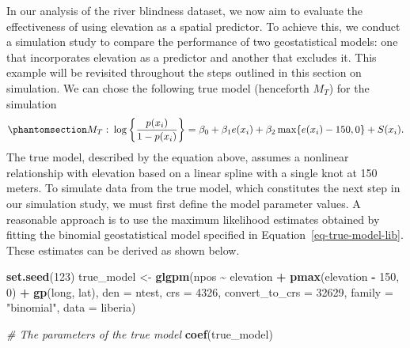 \documentclass[
  letterpaper,
]{krantz}
\newenvironment{Shaded}{\begin{snugshade}}{\end{snugshade}}
\newcommand{\AttributeTok}[1]{\textcolor[rgb]{0.13,0.29,0.53}{#1}}
\newcommand{\CommentTok}[1]{\textcolor[rgb]{0.56,0.35,0.01}{\textit{#1}}}
\newcommand{\DecValTok}[1]{\textcolor[rgb]{0.00,0.00,0.81}{#1}}
\newcommand{\FunctionTok}[1]{\textcolor[rgb]{0.13,0.29,0.53}{\textbf{#1}}}
\newcommand{\NormalTok}[1]{#1}
\newcommand{\OtherTok}[1]{\textcolor[rgb]{0.56,0.35,0.01}{#1}}
\newcommand{\SpecialCharTok}[1]{\textcolor[rgb]{0.81,0.36,0.00}{\textbf{#1}}}
\newcommand{\StringTok}[1]{\textcolor[rgb]{0.31,0.60,0.02}{#1}}
\begin{document}
In our analysis of the river blindness dataset, we now aim to evaluate
the effectiveness of using elevation as a spatial predictor. To achieve
this, we conduct a simulation study to compare the performance of two
geostatistical models: one that incorporates elevation as a predictor
and another that excludes it. This example will be revisited throughout
the steps outlined in this section on simulation. We can chose the
following true model (henceforth \(M_T\)) for the simulation
\begin{equation}\phantomsection\label{eq-true-model-lib}{M_{T}: \:
\log\left\{\frac{p(x_i)}{1-p(x_i)}\right\} = \beta_{0} + \beta_{1}e(x_i) + \beta_{2}\max\{e(x_i)-150, 0\} + S(x_i).
}\end{equation} The true model, described by the equation above, assumes
a nonlinear relationship with elevation based on a linear spline with a
single knot at 150 meters. To simulate data from the true model, which
constitutes the next step in our simulation study, we must first define
the model parameter values. A reasonable approach is to use the maximum
likelihood estimates obtained by fitting the binomial geostatistical
model specified in Equation~\ref{eq-true-model-lib}. These estimates can
be derived as shown below.

\begin{Shaded}
\begin{Highlighting}[]
\FunctionTok{set.seed}\NormalTok{(}\DecValTok{123}\NormalTok{)}
\NormalTok{true\_model }\OtherTok{\textless{}{-}} \FunctionTok{glgpm}\NormalTok{(npos }\SpecialCharTok{\textasciitilde{}}\NormalTok{ elevation }\SpecialCharTok{+} \FunctionTok{pmax}\NormalTok{(elevation }\SpecialCharTok{{-}} \DecValTok{150}\NormalTok{, }\DecValTok{0}\NormalTok{) }\SpecialCharTok{+} 
                           \FunctionTok{gp}\NormalTok{(long, lat),}
                    \AttributeTok{den =}\NormalTok{ ntest,}
                    \AttributeTok{crs =} \DecValTok{4326}\NormalTok{, }
                    \AttributeTok{convert\_to\_crs =} \DecValTok{32629}\NormalTok{,}
                    \AttributeTok{family =} \StringTok{"binomial"}\NormalTok{,}
                    \AttributeTok{data =}\NormalTok{ liberia)}
\end{Highlighting}
\end{Shaded}

\begin{Shaded}
\begin{Highlighting}[]
\CommentTok{\# The parameters of the true model}
\FunctionTok{coef}\NormalTok{(true\_model)}
\end{Highlighting}
\end{Shaded}
\end{document}
